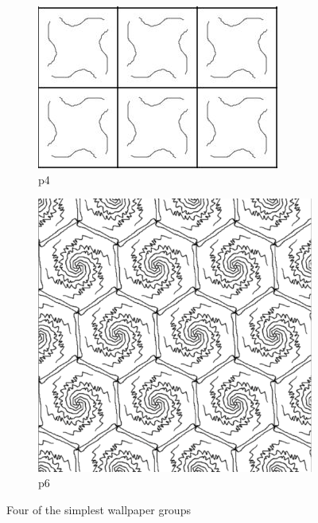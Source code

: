\documentclass{beamer}
\theoremstyle{definition}
\begin{document}
\begin{frame}
\begin{figure}
\begin{subfigure}[b]{0.3\textwidth}
         \includegraphics[width=\textwidth]{Figures/p_examples/p_4_simple_two.JPG}
         \caption{p4}
         \label{fig:p4}
     \end{subfigure}
     \hfill
     \begin{subfigure}[b]{0.3\textwidth}
         \centering
         \includegraphics[width=\textwidth]{Figures/p_examples/P6.png}
         \caption{p6}
         \label{fig:p6}
     \end{subfigure}
        \caption{Four of the simplest wallpaper groups}
        \label{fig:The four ps}       
\end{figure}
\end{frame}
    
\end{document}
